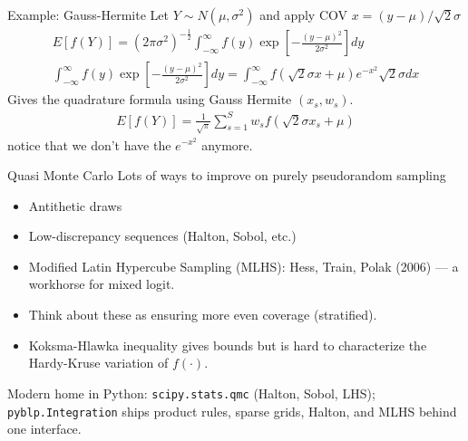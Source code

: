 \documentclass[aspectratio=169,11pt]{beamer}
\begin{document}
\begin{frame}{Example: Gauss-Hermite}
Let $Y\sim N(\mu,\sigma^2)$ and apply COV $x = (y-\mu)/\sqrt{2} \sigma$
\begin{eqnarray*}
E[f(Y)] = (2 \pi \sigma^2)^{-\frac{1}{2}} \int_{-\infty}^{\infty} f(y) \exp\left[-\frac{(y-\mu)^2}{2\sigma^2} \right] dy \\
\int_{-\infty}^{\infty} f(y) \exp\left[-\frac{(y-\mu)^2}{2\sigma^2} \right] dy = \int_{-\infty}^{\infty} f(\sqrt{2} \sigma x + \mu) e^{-x^2} \sqrt{2} \sigma dx
\end{eqnarray*}
Gives the quadrature formula using Gauss Hermite $(x_s,w_s)$.
\begin{eqnarray*}
E[f(Y)] = \frac{1}{\sqrt{\pi}} \sum_{s=1}^S w_s f(\sqrt{2}\sigma x_s+ \mu)
\end{eqnarray*}
notice that we don't have the $e^{-x^2}$ anymore.
\end{frame}



\begin{frame}{Quasi Monte Carlo}
Lots of ways to improve on purely pseudorandom sampling
\begin{itemize}
\item Antithetic draws
\item Low-discrepancy sequences (Halton, Sobol, etc.)
\item Modified Latin Hypercube Sampling (MLHS): Hess, Train, Polak (2006) --- a workhorse for mixed logit.
\item Think about these as ensuring more even coverage (stratified).
\item Koksma-Hlawka inequality gives bounds but is hard to characterize the Hardy-Kruse variation of $f(\cdot)$.
\end{itemize}
Modern home in Python: \texttt{scipy.stats.qmc} (Halton, Sobol, LHS); \texttt{pyblp.Integration} ships product rules, sparse grids, Halton, and MLHS behind one interface.
\end{frame}
\end{document}
